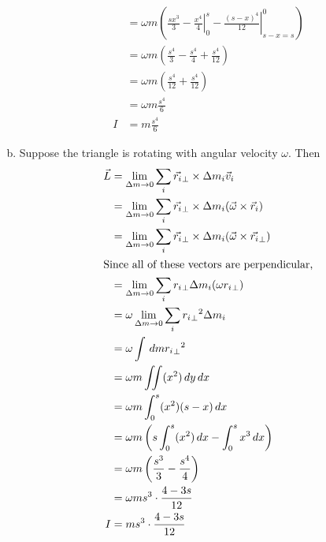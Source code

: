 \documentclass{esg8012pset}
\renewcommand{\d}{\,d}
\begin{document}
\begin{solution}
\begin{enumerate}[(a)]
\begin{align*}
      & = \omega m \left( \left.\frac{sx^3}{3} - \frac{x^4}{4}\right|_0^s - \left.\frac{(s-x)^4}{12}\right|_{s-x=s}^0 \right) \\
      & = \omega m \left( \frac{s^4}{3} - \frac{s^4}{4} + \frac{s^4}{12}\right) \\
      & = \omega m \left( \frac{s^4}{12} + \frac{s^4}{12}\right) \\
      & = \omega m \frac{s^4}{6} \\
    I & = m \frac{s^4}{6}
    \end{align*}
    \item Suppose the triangle is rotating with angular velocity $\omega$.  Then \begin{align*}
      \vec L & = \lim_{\Delta m\to 0} \sum_{i} \vec {r_i}_{\bot} \times \Delta m_i \vec v_i \\
      & = \lim_{\Delta m\to 0} \sum_{i} \vec {r_i}_{\bot} \times \Delta m_i (\vec \omega \times \vec r_i) \\
      & = \lim_{\Delta m\to 0} \sum_{i} \vec {r_i}_{\bot} \times \Delta m_i (\vec \omega \times \vec {r_i}_{\bot}) \\
    \intertext{Since all of these vectors are perpendicular,}
      & = \lim_{\Delta m\to 0} \sum_{i} {r_i}_{\bot} \Delta m_i (\omega {r_i}_{\bot}) \\
      & = \omega \lim_{\Delta m\to 0} \sum_{i} {{r_i}_{\bot}}^2 \Delta m_i \\
      & = \omega \int \d m {{r_i}_{\bot}}^2 \\
      & = \omega m \iint (x^2)\d y \d x \\
      & = \omega m \int_0^s (x^2)(s-x) \d x \\
      & = \omega m \left(s\int_0^s (x^2) \d x - \int_0^s x^3 \d x\right) \\
      & = \omega m \left(\frac{s^3}{3} - \frac{s^4}{4}\right) \\
      & = \omega m s^3 \cdot \frac{4-3s}{12} \\
    I & = m s^3 \cdot \frac{4-3s}{12}
    \end{align*}
  \end{enumerate}
\end{solution}
\end{document}
